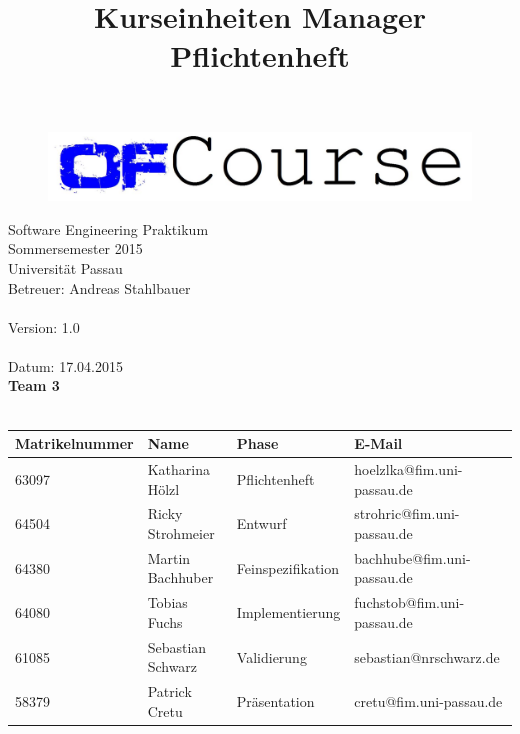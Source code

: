 \documentclass[a4paper]{scrreprt}
\begin{document}
	\thispagestyle{plain}

\begin{titlepage}
    \begin{center}
\begin{figure}[th]
\centering
\includegraphics[width=0.6\linewidth]{logo/name_blau_ofCourse.jpg}
\end{figure}

    	\begin{title}
        	\title{\Huge{\textbf{Kurseinheiten Manager \\ Pflichtenheft\\}}}

		\end{title}
		\hspace{3cm}

        	Software Engineering Praktikum \\
        	Sommersemester 2015\\
        	Universität Passau\\


        	Betreuer: Andreas Stahlbauer\\
        	\hspace{1,5cm}\\
        	Version: 1.0 \\
        	\hspace{1,5cm}\\
        	Datum: 17.04.2015\\[50pt]
        	\textbf{Team 3} \\
            \ \\
    
        
        
        \begin{tabular}{ | l | l | l | l |}
            \hline
            \textbf{Matrikelnummer} & \textbf{Name} & \textbf{Phase} & \textbf{E-Mail}  \\ \hline
            63097 & Katharina Hölzl & Pflichtenheft & hoelzlka@fim.uni-passau.de \\ \hline
            64504 & Ricky Strohmeier& Entwurf & strohric@fim.uni-passau.de  \\ \hline
            64380 & Martin Bachhuber & Feinspezifikation  & bachhube@fim.uni-passau.de \\ \hline
            64080 & Tobias Fuchs & Implementierung  &  fuchstob@fim.uni-passau.de\\ \hline
            61085 & Sebastian Schwarz & Validierung & sebastian@nrschwarz.de \\ \hline  
            58379 & Patrick Cretu  &  Präsentation & cretu@fim.uni-passau.de \\ \hline
        \end{tabular}
    \end{center}
\end{titlepage}
 
\end{document}
